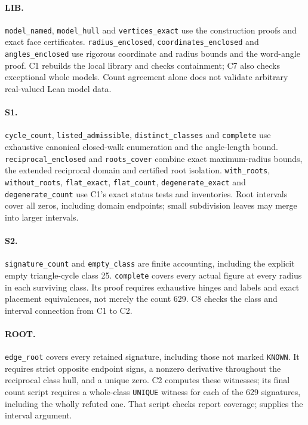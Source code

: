 \documentclass[11pt]{article}
\theoremstyle{definition}
\theoremstyle{remark}
\newcommand{\file}[1]{\path{#1}}
\begin{document}
\paragraph{LIB.}
\texttt{model\_named}, \texttt{model\_hull} and
\texttt{vertices\_exact} use the construction proofs and exact face
certificates. \texttt{radius\_enclosed}, \texttt{coordinates\_enclosed}
and \texttt{angles\_enclosed} use rigorous coordinate and radius
bounds and the word-angle proof. C1 rebuilds the local library and checks
containment; C7 also checks exceptional whole models. Count agreement
alone does not validate arbitrary real-valued Lean model data.

\paragraph{S1.}
\texttt{cycle\_count}, \texttt{listed\_admissible},
\texttt{distinct\_classes} and \texttt{complete} use exhaustive canonical
closed-walk enumeration and the angle-length bound.
\texttt{reciprocal\_enclosed} and \texttt{roots\_cover} combine exact
maximum-radius bounds, the extended reciprocal domain and certified root
isolation. \texttt{with\_roots}, \texttt{without\_roots},
\texttt{flat\_exact}, \texttt{flat\_count},
\texttt{degenerate\_exact} and \texttt{degenerate\_count} use C1's exact
status tests and inventories. Root intervals cover all zeros, including
domain endpoints; small subdivision leaves may merge into larger intervals.

\paragraph{S2.}
\texttt{signature\_count} and \texttt{empty\_class} are finite
accounting, including the explicit empty triangle-cycle class 25.
\texttt{complete} covers every actual figure at every radius in each
surviving class. Its proof requires exhaustive hinges and labels and exact
placement equivalences, not merely the count 629. C8 checks the class and
interval connection from C1 to C2.

\paragraph{ROOT.}
\texttt{edge\_root} covers every retained signature, including those not
marked \texttt{KNOWN}. It requires strict opposite endpoint signs, a
nonzero derivative throughout the reciprocal class hull, and a unique
zero. C2 computes these witnesses; its final count script requires a
whole-class \texttt{UNIQUE} witness for each of the 629 signatures,
including the wholly refuted one. That script checks report coverage;
\file{checks/independent-s23/s3_radius.py} supplies the interval argument.
\end{document}
